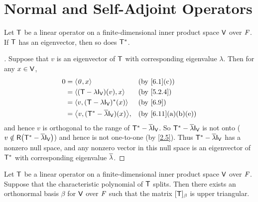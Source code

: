 \section{Normal and Self-Adjoint Operators}\label{sec:6.4}

\begin{lem}\label{6.4.1}
  Let \(\mathsf{T}\) be a linear operator on a finite-dimensional inner product space \(\mathsf{V}\) over \(\mathit{F}\).
  If \(\mathsf{T}\) has an eigenvector, then so does \(\mathsf{T}^*\).
\end{lem}

\begin{proof}[]
  Suppose that \(v\) is an eigenvector of \(\mathsf{T}\) with corresponding eigenvalue \(\lambda\).
  Then for any \(x \in \mathsf{V}\),
  \begin{align*}
    0 & = \inn{\zv, x}                                 &  & \text{(by \cref{6.1}(c))}        \\
      & = \inn{(\T - \lambda \IT[\V])(v), x}           &  & \text{(by \cref{5.2.4})}         \\
      & = \inn{v, (\T - \lambda \IT[\V])^*(x)}         &  & \text{(by \cref{6.9})}           \\
      & = \inn{v, (\T^* - \conj{\lambda} \IT[\V])(x)}, &  & \text{(by \cref{6.11}(a)(b)(e))}
  \end{align*}
  and hence \(v\) is orthogonal to the range of \(\T^* - \conj{\lambda} \IT[\V]\).
  So \(\T^* - \conj{\lambda} \IT[\V]\) is not onto (\(v \notin \rg{\T^* - \conj{\lambda} \IT[\V]}\)) and hence is not one-to-one (by \cref{2.5}).
  Thus \(\T^* - \conj{\lambda} \IT[\V]\) has a nonzero null space, and any nonzero vector in this null space is an eigenvector of \(\mathsf{T}^*\) with corresponding eigenvalue \(\overline{\lambda}\).
\end{proof}

\begin{thm}\label{6.14}
  Let \(\mathsf{T}\) be a linear operator on a finite-dimensional inner product space \(\mathsf{V}\) over \(\mathit{F}\).
  Suppose that the characteristic polynomial of \(\mathsf{T}\) splits.
  Then there exists an orthonormal basis \(\beta\) for \(\mathsf{V}\) over \(\mathit{F}\) such that the matrix \([\mathsf{T}]_{\beta}\) is upper triangular.
\end{thm}

